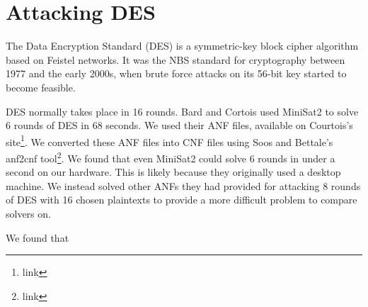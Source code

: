 \section{Attacking DES}
The Data Encryption Standard (DES) is a symmetric-key block cipher algorithm based on Feistel networks. It was the NBS standard for cryptography between 1977 and the early 2000s, when brute force attacks on its 56-bit key started to become feasible.\cite{find appropriate citation}

DES normally takes place in 16 rounds. Bard and Cortois\cite{citation} used MiniSat2 to solve 6 rounds of DES in 68 seconds. We used their ANF files, available on Courtois's site\footnote{link}. We converted these ANF files into CNF files using Soos and Bettale's anf2cnf tool\footnote{link}. We found that even MiniSat2 could solve 6 rounds in under a second on our hardware. This is likely because they originally used a desktop machine. We instead solved other ANFs they had provided for attacking 8 rounds of DES with 16 chosen plaintexts to provide a more difficult problem to compare solvers on.

We found that 

%		
%	

